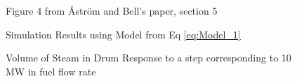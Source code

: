         \begin{figure}[ht]
            \begin{center}
                
                Figure 4 from \r{A}str\"{o}m and Bell's paper, section 5 \cite{Astrom}    
                
                
                Simulation Results using Model from Eq \eqref{eq:Model_1}
                
                \caption{Volume of Steam in Drum Response to a step corresponding to 10 MW in fuel flow rate}
                \label{fig:Fig4B}                
            \end{center}
        \end{figure}
